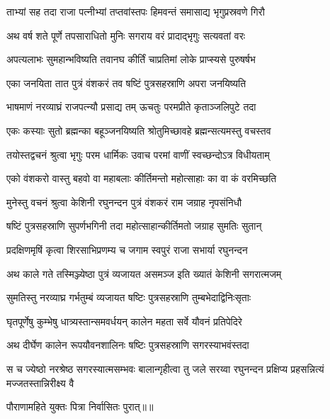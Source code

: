 \twolineshloka
{ताभ्यां सह तदा राजा पत्नीभ्यां तप्तवांस्तपः}
{हिमवन्तं समासाद्य भृगुप्रस्रवणे गिरौ} %

\twolineshloka
{अथ वर्ष शते पूर्णे तपसाराधितो मुनिः}
{सगराय वरं प्रादाद्भृगुः सत्यवतां वरः} %

\twolineshloka
{अपत्यलाभः सुमहान्भविष्यति तवानघ}
{कीर्तिं चाप्रतिमां लोके प्राप्स्यसे पुरुषर्षभ} %

\twolineshloka
{एका जनयिता तात पुत्रं वंशकरं तव}
{षष्टिं पुत्रसहस्राणि अपरा जनयिष्यति} %

\twolineshloka
{भाषमाणं नरव्याघ्रं राजपत्न्यौ प्रसाद्य तम्}
{ऊचतुः परमप्रीते कृताञ्जलिपुटे तदा} %

\twolineshloka
{एकः कस्याः सुतो ब्रह्मन्का बहूञ्जनयिष्यति}
{श्रोतुमिच्छावहे ब्रह्मन्सत्यमस्तु वचस्तव} %

\twolineshloka
{तयोस्तद्वचनं श्रुत्वा भृगुः परम धार्मिकः}
{उवाच परमां वाणीं स्वच्छन्दोऽत्र विधीयताम्} %

\twolineshloka
{एको वंशकरो वास्तु बहवो वा महाबलाः}
{कीर्तिमन्तो महोत्साहाः का वा कं वरमिच्छति} %

\twolineshloka
{मुनेस्तु वचनं श्रुत्वा केशिनी रघुनन्दन}
{पुत्रं वंशकरं राम जग्राह नृपसंनिधौ} %

\twolineshloka
{षष्टिं पुत्रसहस्राणि सुपर्णभगिनी तदा}
{महोत्साहान्कीर्तिमतो जग्राह सुमतिः सुतान्} %

\twolineshloka
{प्रदक्षिणमृषिं कृत्वा शिरसाभिप्रणम्य च}
{जगाम स्वपुरं राजा सभार्या रघुनन्दन} %

\twolineshloka
{अथ काले गते तस्मिञ्ज्येष्ठा पुत्रं व्यजायत}
{असमञ्ज इति ख्यातं केशिनी सगरात्मजम्} %

\twolineshloka
{सुमतिस्तु नरव्याघ्र गर्भतुम्बं व्यजायत}
{षष्टिः पुत्रसहस्राणि तुम्बभेदाद्विनिःसृताः} %

\twolineshloka
{घृतपूर्णेषु कुम्भेषु धात्र्यस्तान्समवर्धयन्}
{कालेन महता सर्वे यौवनं प्रतिपेदिरे} %

\twolineshloka
{अथ दीर्घेण कालेन रूपयौवनशालिनः}
{षष्टिः पुत्रसहस्राणि सगरस्याभवंस्तदा} %

\threelineshloka
{स च ज्येष्ठो नरश्रेष्ठ सगरस्यात्मसम्भवः}
{बालान्गृहीत्वा तु जले सरय्वा रघुनन्दन}
{प्रक्षिप्य प्रहसन्नित्यं मज्जतस्तान्निरीक्ष्य वै} %

{पौराणामहिते युक्तः पित्रा निर्वासितः पुरात्॥॥} %

\addtocounter{shlokacount}{1}

